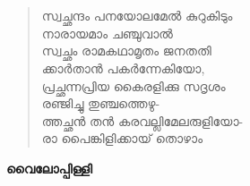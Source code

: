 \chapter*{}

\begin{verse}
സ്വച്ഛന്ദം പനയോലമേല്‍ കുറുകിടും\\
നാരായമാം ചഞ്ചുവാല്‍\\
സ്വച്ഛം രാമകഥാമൃതം ജനതതി\\
ക്കാര്‍താന്‍ പകര്‍ന്നേകിയോ,\\
പ്രച്ഛന്നപ്രിയ കൈരളിക്കു സദൃശം\\
രഞ്ജിച്ചു തുഞ്ചത്തെഴു-\\
ത്തച്ഛന്‍ തന്‍ കരവല്ലിമേലരുളിയോ-\\
രാ പൈങ്കിളിക്കായ് തൊഴാം
\end{verse}

\begin{flushright}
\textbf{വൈലോപ്പിള്ളി}
\end{flushright}
